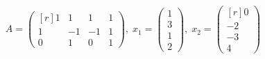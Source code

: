 $$
A = \begin{pmatrix*}[r]
  1 &  1 &  1 & 1 \\
  1 & -1 & -1 & 1 \\
  0 &  1 &  0 & 1
\end{pmatrix*},\; x_1 = \begin{pmatrix}
  1 \\
  3 \\
  1 \\
  2
\end{pmatrix},\; x_2 = \begin{pmatrix*}[r]
   0 \\
  -2 \\
  -3 \\
   4
\end{pmatrix*}
$$


\begin{solution}
  \ \\
\end{solution}